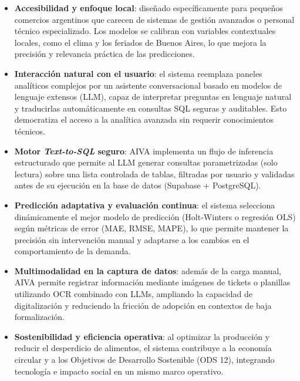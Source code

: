 \begin{itemize}
    \item \textbf{Accesibilidad y enfoque local}: diseñado específicamente para pequeños comercios argentinos que carecen de sistemas de gestión avanzados o personal técnico especializado. Los modelos se calibran con variables contextuales locales, como el clima y los feriados de Buenos Aires, lo que mejora la precisión y relevancia práctica de las predicciones.

    \item \textbf{Interacción natural con el usuario}: el sistema reemplaza paneles analíticos complejos por un asistente conversacional basado en modelos de lenguaje extensos (LLM), capaz de interpretar preguntas en lenguaje natural y traducirlas automáticamente en consultas SQL seguras y auditables. Esto democratiza el acceso a la analítica avanzada sin requerir conocimientos técnicos.

    \item \textbf{Motor \textit{Text-to-SQL} seguro}: AIVA implementa un flujo de inferencia estructurado que permite al LLM generar consultas parametrizadas (solo lectura) sobre una lista controlada de tablas, filtradas por usuario y validadas antes de su ejecución en la base de datos (Supabase + PostgreSQL).

    \item \textbf{Predicción adaptativa y evaluación continua}: el sistema selecciona dinámicamente el mejor modelo de predicción (Holt-Winters o regresión OLS) según métricas de error (MAE, RMSE, MAPE), lo que permite mantener la precisión sin intervención manual y adaptarse a los cambios en el comportamiento de la demanda.

    \item \textbf{Multimodalidad en la captura de datos}: además de la carga manual, AIVA permite registrar información mediante imágenes de tickets o planillas utilizando OCR combinado con LLMs, ampliando la capacidad de digitalización y reduciendo la fricción de adopción en contextos de baja formalización.

    \item \textbf{Sostenibilidad y eficiencia operativa}: al optimizar la producción y reducir el desperdicio de alimentos, el sistema contribuye a la economía circular y a los Objetivos de Desarrollo Sostenible (ODS 12), integrando tecnología e impacto social en un mismo marco operativo.
\end{itemize}



